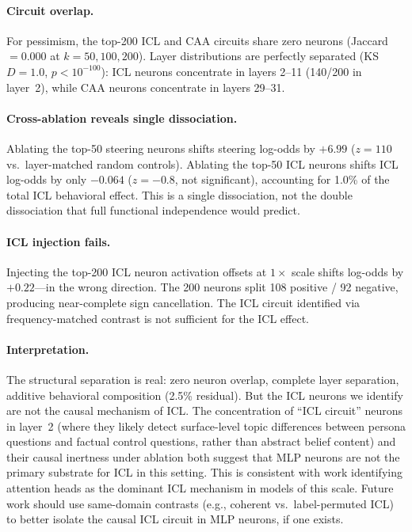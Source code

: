 \documentclass[11pt]{article}
\begin{document}
\paragraph{Circuit overlap.}
For pessimism, the top-200 ICL and CAA circuits share zero neurons (Jaccard $= 0.000$ at $k = 50, 100, 200$).
Layer distributions are perfectly separated (KS $D = 1.0$, $p < 10^{-100}$): ICL neurons concentrate in layers 2--11 (140/200 in layer~2), while CAA neurons concentrate in layers 29--31.

\paragraph{Cross-ablation reveals single dissociation.}
Ablating the top-50 steering neurons shifts steering log-odds by $+6.99$ ($z = 110$ vs.\ layer-matched random controls).
Ablating the top-50 ICL neurons shifts ICL log-odds by only $-0.064$ ($z = -0.8$, not significant), accounting for 1.0\% of the total ICL behavioral effect.
This is a single dissociation, not the double dissociation that full functional independence would predict.

\paragraph{ICL injection fails.}
Injecting the top-200 ICL neuron activation offsets at $1\times$ scale shifts log-odds by $+0.22$---in the wrong direction.
The 200 neurons split 108 positive / 92 negative, producing near-complete sign cancellation.
The ICL circuit identified via frequency-matched contrast is not sufficient for the ICL effect.

\paragraph{Interpretation.}
The structural separation is real: zero neuron overlap, complete layer separation, additive behavioral composition (2.5\% residual).
But the ICL neurons we identify are not the causal mechanism of ICL.
The concentration of ``ICL circuit'' neurons in layer~2 (where they likely detect surface-level topic differences between persona questions and factual control questions, rather than abstract belief content) and their causal inertness under ablation both suggest that MLP neurons are not the primary substrate for ICL in this setting.
This is consistent with work identifying attention heads as the dominant ICL mechanism in models of this scale.
Future work should use same-domain contrasts (e.g., coherent vs.\ label-permuted ICL) to better isolate the causal ICL circuit in MLP neurons, if one exists.
\end{document}
